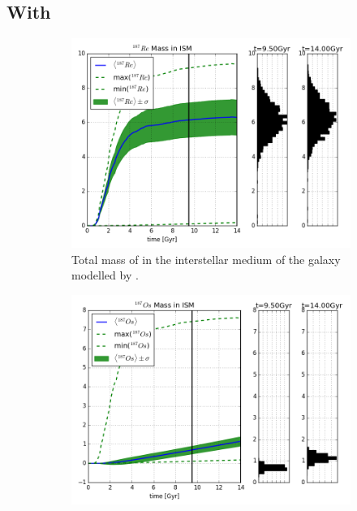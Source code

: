 \subsection{With \betadecay}
\label{sec:results-decay}
\begin{figure}
  \centering
  \begin{subfigure}{\subfigwidth}
    \includegraphics[width=\linewidth]{results/MCExperiment_revised_2/combined_plot_Re-187_decayed.png}
    \caption{\label{fig:MCExperiment-decay-re187}
      Total mass of  in the interstellar medium of the galaxy modelled by \omegamodel.
    }
  \end{subfigure}
  \begin{subfigure}{\subfigwidth}
    \includegraphics[width=\linewidth]{results/MCExperiment_revised_2/combined_plot_Os-187_decayed.png}

\end{subfigure}
\end{figure}
